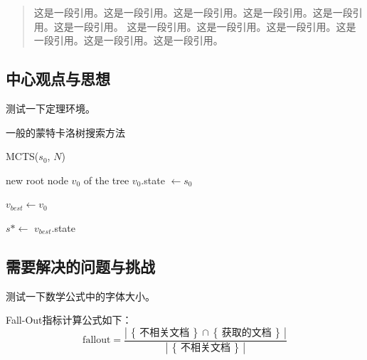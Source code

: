 \begin{quote}
这是一段引用。这是一段引用。这是一段引用。这是一段引用。这是一段引用。这是一段引用。
这是一段引用。这是一段引用。这是一段引用。这是一段引用。这是一段引用。这是一段引用。
\end{quote}




\subsection{中心观点与思想}

测试一下定理环境。

\begin{algorithm}[] \caption{一般的蒙特卡洛树搜索方法}\label{algo:raw_MCTS} %
    
    
    \Func MCTS($s_0$, $N$)
    
    
	 new root node $v_0$ of the tree\; 
	 $v_0$.state $\leftarrow s_0$ \;
	 
	 
	 $v_{best} \leftarrow v_0$\;
	 
	 $s* \leftarrow$ $v_{best}$.state\;
	 
\end{algorithm}


\subsection{需要解决的问题与挑战}

测试一下数学公式中的字体大小。

\newcommand{\set}[1]{\left\{\,#1\,\right\}}
\newcommand{\card}[1]{\left|\,#1\,\right|}

Fall-Out指标计算公式如下：
\begin{equation*}
  \mbox{fallout} = \frac{\card{\set{\text{不相关文档}}\cap\set{\text{获取的文档}}}}{\card{\set{\text{不相关文档}}}}
\end{equation*}



